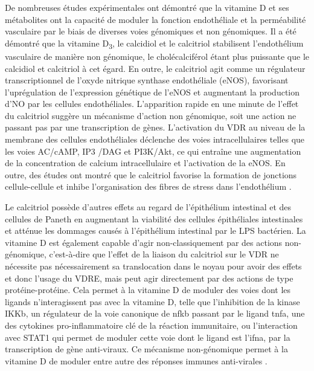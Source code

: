 \documentclass[
  a4paper,
  DIV=11,
  numbers=noendperiod,
  listof=totoc]{scrreprt}
\begin{document}
De nombreuses études expérimentales ont démontré que la vitamine D et
ses métabolites ont la capacité de moduler la fonction endothéliale et
la perméabilité vasculaire par le biais de diverses voies génomiques et
non génomiques. Il a été démontré que la vitamine D\textsubscript{3}, le
calcidiol et le calcitriol stabilisent l'endothélium vasculaire de
manière non génomique, le cholécalciférol étant plus puissante que le
calcidiol et calcitriol à cet égard. En outre, le calcitriol agit comme
un régulateur transcriptionnel de l'oxyde nitrique synthase endothéliale
(\acs{eNOS}), favorisant l'uprégulation de l'expression
génétique de l'\ac{eNOS} et augmentant la production d'\ac{NO} par les
cellules endothéliales. L'apparition rapide en une minute de l'effet du
calcitriol suggère un mécanisme d'action non génomique, soit une action
ne passant pas par une transcription de gènes. L'activation du \ac{VDR}
au niveau de la membrane des cellules endothéliales déclenche des voies
intracellulaires telles que les voies AC/cAMP, IP3 /DAG et PI3K/Akt, ce
qui entraîne une augmentation de la concentration de calcium
intracellulaire et l'activation de la \ac{eNOS}. En outre, des études
ont montré que le calcitriol favorise la formation de jonctions
cellule-cellule et inhibe l'organisation des fibres de stress dans
l'endothélium \autocite{Charoenngam.2020}.

Le calcitriol possède d'autres effets au regard de l'épithélium
intestinal et des cellules de Paneth en augmentant la viabilité des
cellules épithéliales intestinales et atténue les dommages causés à
l'épithélium intestinal par le \ac{LPS} bactérien. La vitamine D est
également capable d'agir non-classiquement par des actions
non-génomique, c'est-à-dire que l'effet de la liaison du calcitriol sur
le VDR ne nécessite pas nécessairement sa translocation dans le noyau
pour avoir des effets et donc l'usage du \ac{VDRE}, mais peut agir
directement par des actions de type protéine-protéine. Cela permet à la
vitamine D de moduler des voies dont les ligands n'interagissent pas
avec la vitamine D, telle que l'inhibition de la kinase \ac{IKKb}, un
régulateur de la voie canonique de \ac{nfkb} passant par le ligand
\ac{tnfa}, une des cytokines pro-inflammatoire clé de la réaction
immunitaire, ou l'interaction avec STAT1 qui permet de moduler cette
voie dont le ligand est l'\ac{ifna}, par la transcription de gène
anti-viraux. Ce mécanisme non-génomique permet à la vitamine D de
moduler entre autre des réponses immunes anti-virales \autocites[
]{Hii.2016}{Chen.2013.IKKb}.
\end{document}
